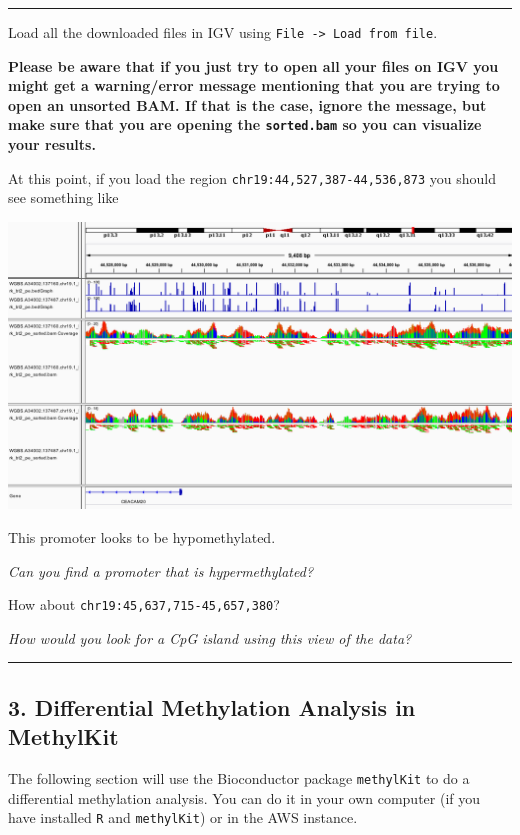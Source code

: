 \documentclass[
]{book}
\begin{document}
\begin{center}\rule{0.5\linewidth}{0.5pt}\end{center}

Load all the downloaded files in IGV using \texttt{File\ -\textgreater{}\ Load\ from\ file}.

\textbf{Please be aware that if you just try to open all your files on IGV you might get a warning/error message mentioning that you are trying to open an unsorted BAM. If that is the case, ignore the message, but make sure that you are opening the \texttt{sorted.bam} so you can visualize your results.}

At this point, if you load the region \texttt{chr19:44,527,387-44,536,873} you should see something like

\includegraphics{./img/region2_full.png}

This promoter looks to be hypomethylated.

\emph{Can you find a promoter that is hypermethylated?}

How about \texttt{chr19:45,637,715-45,657,380}?

\emph{How would you look for a CpG island using this view of the data?}

\begin{center}\rule{0.5\linewidth}{0.5pt}\end{center}

\subsection{3. Differential Methylation Analysis in MethylKit}\label{differential-methylation-analysis-in-methylkit}

The following section will use the Bioconductor package \texttt{methylKit} to do a differential methylation analysis.
You can do it in your own computer (if you have installed \texttt{R} and \texttt{methylKit}) or in the AWS instance.
\end{document}
